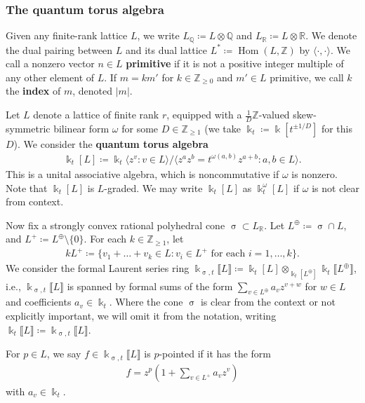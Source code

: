 \documentclass{amsart}
\DeclareMathOperator{\Hom}{Hom}
\let\llb=\llbracket
\let\rrb=\rrbracket
\let\bb=\mathbb
\newcommand {\kk} {\Bbbk}
\newcommand {\kt} {\kk_t}
\renewcommand{\sigma}{\upsigma}
\theoremstyle{plain}%
\theoremstyle{definition}
\theoremstyle{remark}
\begin{document}
\subsubsection{The quantum torus algebra}\label{qtoralg}
Given any finite-rank lattice $L$, we write $L_{\bb{Q}}\coloneqq L\otimes \bb{Q}$ and $L_{\bb{R}} \coloneqq  L\otimes \bb{R}$.  We denote the dual pairing between $L$ and its dual lattice $L^*\coloneqq \Hom(L,\bb{Z})$ by $\langle \cdot,\cdot\rangle$.  We call a nonzero vector $n\in L$ \textbf{primitive} if it is not a positive integer multiple of any other element of $L$.  If $m=km'$ for $k\in \bb{Z}_{\geq 0}$ and $m'\in L$ primitive, we call $k$ the \textbf{index} of $m$, denoted $|m|$.

Let $L$ denote a lattice of finite rank $r$, equipped with a $\frac{1}{D}\bb{Z}$-valued skew-symmetric bilinear form $\omega$ for some $D\in \bb{Z}_{\geq 1}$ (we take $\kk_t\coloneqq \kk[t^{\pm 1/D}]$ for this $D$).  We consider the \textbf{quantum torus algebra}
\begin{align}\label{qtor}
    \kk_t[L]\coloneqq \kt\langle z^v\colon v\in L\rangle /\langle z^{a}z^{b}=t^{\omega(a,b)}z^{a+b} \colon a,b\in L\rangle.
\end{align}
This is a unital associative algebra, which is noncommutative if $\omega$ is nonzero.  Note that $\kk_t[L]$ is $L$-graded.  We may write $\kk_t[L]$ as $\kk^{\omega}_t[L]$ if $\omega$ is not clear from context.


Now fix a strongly convex rational polyhedral cone $\sigma\subset L_{\bb{R}}$.  Let $L^{\oplus}\coloneqq \sigma\cap L$, and $L^+\coloneqq L^{\oplus} \setminus \{0\}$. 
 For each $k\in \bb{Z}_{\geq 1}$, let
\begin{align}\label{kNplus}
kL^+\coloneqq \{v_1+\ldots+v_k\in L\colon v_i\in L^+ \mbox{ for each } i=1,\ldots,k\}.
\end{align} 
We consider the formal Laurent series ring $\kk_{\sigma,t}\llb L\rrb\coloneqq \kk_t[L]\otimes_{\kk_t[L^{\oplus}]} \kk_t\llb L^{\oplus}\rrb$, i.e., $\kk_{\sigma,t}\llb L\rrb$ is spanned by formal sums of the form $\sum_{v\in L^{\oplus}} a_vz^{v+w}$ for $w\in L$ and coefficients $a_v\in \kt$. Where the cone $\sigma$ is clear from the context or not explicitly important, we will omit it from the notation, writing $\kk_t\llb L\rrb\coloneqq \kk_{\sigma,t}\llb L\rrb$.

For $p\in L$, we say $f\in \kk_{\sigma,t}\llb L\rrb$ is $p$-pointed if it has the form \begin{align*}
    f=z^p\left(1+\sum_{v\in L^+} a_vz^v\right)
\end{align*} 
with $a_v\in \kt$.
\end{document}

